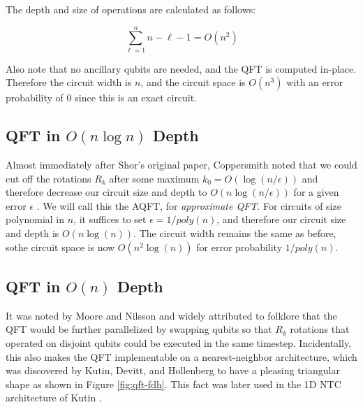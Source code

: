 The depth and size of operations are calculated as follows:

\begin{equation}
\sum_{\ell=1}^n n-\ell-1 = O(n^2)
\end{equation}

Also note that no ancillary qubits are needed, and the QFT is computed
in-place. Therefore the circuit width is $n$, and the circuit space is
$O(n^3)$ with an error probability of $0$ since this is an exact circuit.

\subsection{QFT in $O(n\log n)$ Depth}
\label{subsec:qft-loglin}

Almost immediately after Shor's original paper, Coppersmith noted that we
could cut off the rotations $R_k$ after some maximum $k_0 = O(\log(n/\epsilon))$
and therefore decrease
our circuit size and depth to $O(n\log(n/\epsilon))$ for a given
error $\epsilon$ \cite{Coppersmith1994}. We will call this the AQFT,
for \emph{approximate QFT}. For circuits of size polynomial
in $n$, it suffices to set $\epsilon = 1/poly(n)$, and therefore our
circuit size and depth is $O(n\log(n))$. The circuit width remains the same
as before, sothe circuit space is now $O(n^2\log(n))$ for
error probability $1/poly(n)$.


\subsection{QFT in $O(n)$ Depth}
\label{subsec:qft-linear}

It was noted by Moore and Nilsson \cite{Moore1998} and widely attributed
to folklore that the QFT would be further parallelized by swapping qubits
so that $R_k$ rotations that operated on disjoint qubits could be executed
in the same timestep. Incidentally, this also makes the QFT implementable
on a nearest-neighbor architecture, which was discovered by Kutin, Devitt,
and Hollenberg \cite{Fowler2004} to have a pleasing triangular shape
as shown in Figure \ref{fig:qft-fdh}. This fact was later
used in the 1D NTC
architecture of Kutin \cite{Kutin2006}.


